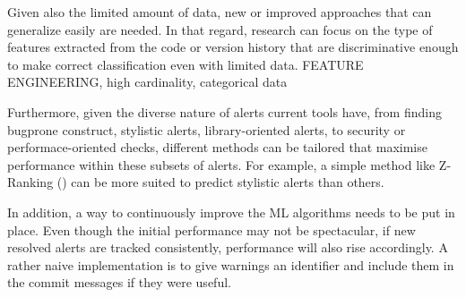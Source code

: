 Given also the limited amount of data, new or improved approaches that can generalize easily are needed. In that regard, research can focus on the type of features extracted from the code or version history that are discriminative enough to make correct classification even with limited data. FEATURE ENGINEERING, high cardinality, categorical data

Furthermore, given the diverse nature of alerts current tools have, from finding bugprone construct, stylistic alerts, library-oriented alerts, to security or performace-oriented checks, different methods can be tailored that maximise performance within these subsets of alerts. For example, a simple method like Z-Ranking (\cite{z-ranking}) can be more suited to predict stylistic alerts than others.

In addition, a way to continuously improve the ML algorithms needs to be put in place. Even though the initial performance may not be spectacular, if new resolved alerts are tracked consistently, performance will also rise accordingly. A rather naive implementation is to give warnings an identifier and include them in the commit messages if they were useful.

